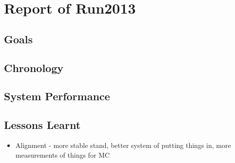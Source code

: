 \section{Report of Run2013}

\subsection{Goals}

\subsection{Chronology}

\subsection{System Performance}

\subsection{Lessons Learnt}
\begin{itemize}
 \item{Alignment - more stable stand, better system of putting things in, more measurements of things for MC}
\end{itemize}
